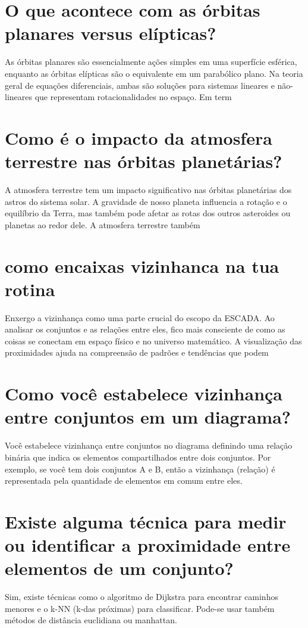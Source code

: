 \documentclass[11pt,a4paper]{article}
\begin{document}
\section{O que acontece com as órbitas planares versus elípticas?}
As órbitas planares são essencialmente ações simples em uma superfície esférica, enquanto as órbitas elípticas são o equivalente em um parabólico plano. Na teoria geral de equações diferenciais, ambas são soluções para sistemas lineares e não-lineares que representam rotacionalidades no espaço. Em term

\section{Como é o impacto da atmosfera terrestre nas órbitas planetárias?}
A atmosfera terrestre tem um impacto significativo nas órbitas planetárias dos astros do sistema solar. A gravidade de nosso planeta influencia a rotação e o equilíbrio da Terra, mas também pode afetar as rotas dos outros asteroides ou planetas ao redor dele. A atmosfera terrestre também

\section{como encaixas vizinhanca na tua rotina}
Enxergo a vizinhança como uma parte crucial do escopo da ESCADA. Ao analisar os conjuntos e as relações entre eles, fico mais consciente de como as coisas se conectam em espaço físico e no universo matemático. A visualização das proximidades ajuda na compreensão de padrões e tendências que podem

\section{Como você estabelece vizinhança entre conjuntos em um diagrama?}
Você estabelece vizinhança entre conjuntos no diagrama definindo uma relação binária que indica os elementos compartilhados entre dois conjuntos. Por exemplo, se você tem dois conjuntos A e B, então a vizinhança (relação) é representada pela quantidade de elementos em comum entre eles.

\section{Existe alguma técnica para medir ou identificar a proximidade entre elementos de um conjunto?}
Sim, existe técnicas como o algoritmo de Dijkstra para encontrar caminhos menores e o k-NN (k-das próximas) para classificar. Pode-se usar também métodos de distância euclidiana ou manhattan.
\end{document}
